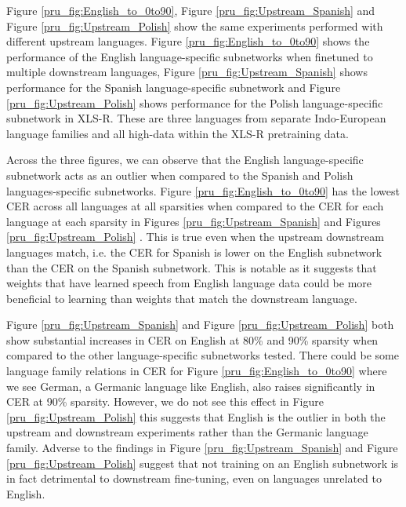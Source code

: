 Figure \ref{pru_fig:English_to_0to90}, Figure \ref{pru_fig:Upstream_Spanish} and Figure \ref{pru_fig:Upstream_Polish} show the same experiments performed with different upstream languages. Figure \ref{pru_fig:English_to_0to90} shows the performance of the English  language-specific subnetworks when finetuned to multiple downstream languages, Figure \ref{pru_fig:Upstream_Spanish} shows performance for the Spanish language-specific subnetwork and Figure \ref{pru_fig:Upstream_Polish} shows performance for the Polish language-specific subnetwork in XLS-R. These are three languages from separate Indo-European language families \cite{bauer2007linguistics} and all high-data within the XLS-R pretraining data. 

Across the three figures, we can observe that the English language-specific subnetwork acts as an outlier when compared to the Spanish and Polish languages-specific subnetworks. Figure \ref{pru_fig:English_to_0to90} has the lowest CER across all languages at all sparsities when compared to the CER for each language at each sparsity in Figures \ref{pru_fig:Upstream_Spanish} and Figures \ref{pru_fig:Upstream_Polish} . This is true even when the upstream downstream languages match, i.e. the CER for Spanish is lower on the English subnetwork than the CER on the Spanish subnetwork. This is notable as it suggests that weights that have learned speech from English language data could be more beneficial to learning than weights that match the downstream language. %

Figure \ref{pru_fig:Upstream_Spanish} and Figure \ref{pru_fig:Upstream_Polish} both show substantial increases in CER on English at 80\% and 90\% sparsity when compared to the other language-specific subnetworks tested. There could be some language family relations in CER for Figure \ref{pru_fig:English_to_0to90} where we see German, a Germanic language like English, also raises significantly in CER at 90\% sparsity. However, we do not see this effect in Figure \ref{pru_fig:Upstream_Polish} this suggests that English is the outlier in both the upstream and downstream experiments rather than the Germanic language family. Adverse to the findings in \cite{PARP} Figure \ref{pru_fig:Upstream_Spanish} and Figure \ref{pru_fig:Upstream_Polish} suggest that not training on an English subnetwork is in fact detrimental to downstream fine-tuning, even on languages unrelated to English. %

